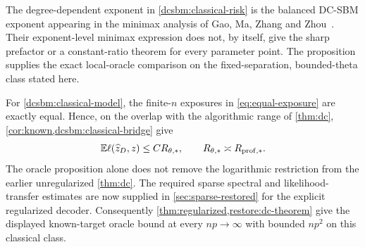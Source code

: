 \begin{remark}
\label{dcsbm:classical-scope}
The degree-dependent exponent in \eqref{dcsbm:classical-risk} is the
balanced DC-SBM exponent appearing in the minimax analysis of
Gao, Ma, Zhang and Zhou~\cite{gmzz2018}. Their exponent-level
minimax expression does not, by itself, give the sharp prefactor
or a constant-ratio theorem for every parameter point.
The proposition supplies the exact local-oracle comparison on the
fixed-separation, bounded-theta class stated here.

For \eqref{dcsbm:classical-model}, the finite-\(n\) exposures in
\eqref{eq:equal-exposure} are exactly equal. Hence, on the overlap
with the algorithmic range of \cref{thm:dc},
\cref{cor:known,dcsbm:classical-bridge} give
\[
 \mathbb E\ell(\widehat z_D,z)\le C R_{\theta,*},
 \qquad R_{\theta,*}\asymp R_{\mathrm{prof},*}.
\]
The oracle proposition alone does not remove the logarithmic
restriction from the earlier unregularized \cref{thm:dc}.
The required sparse spectral and likelihood-transfer estimates are
now supplied in \cref{sec:sparse-restored} for the explicit regularized
decoder. Consequently \cref{thm:regularized,restore:dc-theorem} give
the displayed known-target oracle bound at every $np\to\infty$
with bounded $np^2$ on this classical class.
\end{remark}

